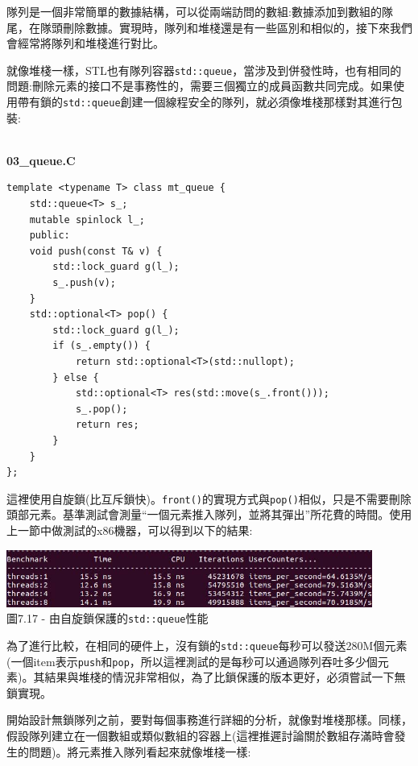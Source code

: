 
隊列是一個非常簡單的數據結構，可以從兩端訪問的數組:數據添加到數組的隊尾，在隊頭刪除數據。實現時，隊列和堆棧還是有一些區別和相似的，接下來我們會經常將隊列和堆棧進行對比。

就像堆棧一樣，STL也有隊列容器\texttt{std::queue}，當涉及到併發性時，也有相同的問題:刪除元素的接口不是事務性的，需要三個獨立的成員函數共同完成。如果使用帶有鎖的\texttt{std::queue}創建一個線程安全的隊列，就必須像堆棧那樣對其進行包裝:

\hspace*{\fill} \\ %
\noindent
\textbf{03\_queue.C}
\begin{lstlisting}[style=styleCXX]
template <typename T> class mt_queue {
	std::queue<T> s_;
	mutable spinlock l_;
	public:
	void push(const T& v) {
		std::lock_guard g(l_);
		s_.push(v);
	}
	std::optional<T> pop() {
		std::lock_guard g(l_);
		if (s_.empty()) {
			return std::optional<T>(std::nullopt);
		} else {
			std::optional<T> res(std::move(s_.front()));
			s_.pop();
			return res;
		}
	}
};
\end{lstlisting}

這裡使用自旋鎖(比互斥鎖快)。\texttt{front()}的實現方式與\texttt{pop()}相似，只是不需要刪除頭部元素。基準測試會測量“一個元素推入隊列，並將其彈出”所花費的時間。使用上一節中做測試的x86機器，可以得到以下的結果:

\begin{center}
\includegraphics[width=0.9\textwidth]{content/2/chapter7/images/17.jpg}\\
圖7.17 - 由自旋鎖保護的\texttt{std::queue}性能
\end{center}

為了進行比較，在相同的硬件上，沒有鎖的\texttt{std::queue}每秒可以發送280M個元素(一個item表示\texttt{push}和\texttt{pop}，所以這裡測試的是每秒可以通過隊列吞吐多少個元素)。其結果與堆棧的情況非常相似，為了比鎖保護的版本更好，必須嘗試一下無鎖實現。


開始設計無鎖隊列之前，要對每個事務進行詳細的分析，就像對堆棧那樣。同樣，假設隊列建立在一個數組或類似數組的容器上(這裡推遲討論關於數組存滿時會發生的問題)。將元素推入隊列看起來就像堆棧一樣:

